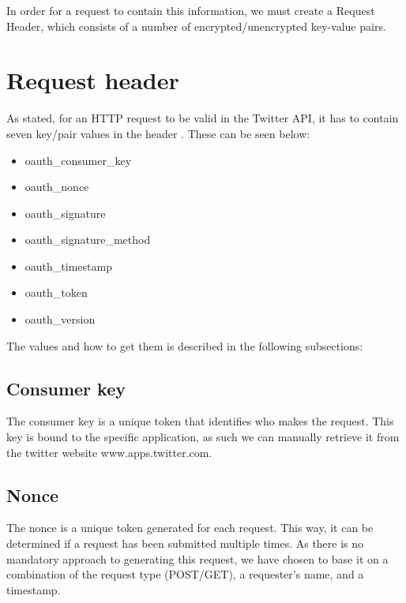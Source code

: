In order for a request to contain this information, we must create a Request
Header, which consists of a number of encrypted/unencrypted key-value pairs. 

\section{Request header}\label{sec:reqHead}
As stated, for an \ac{HTTP} request to be valid in the Twitter API, it has to
contain seven key/pair values in the header \citep{TwitterAPIAuth}. These can
be seen below:

\begin{itemize}
  \item oauth\_consumer\_key
  \item oauth\_nonce
  \item oauth\_signature
  \item oauth\_signature\_method
  \item oauth\_timestamp
  \item oauth\_token
  \item oauth\_version
\end{itemize}

The values and how to get them is described in the following subsections:

\subsection*{Consumer key}
The consumer key is a unique token that identifies who makes the request.
This key is bound to the specific application, as such we can manually retrieve
it from the twitter website www.apps.twitter.com.

\subsection*{Nonce}
The nonce is a unique token generated for each request. This way, it can be
determined if a request has been submitted multiple times. As there is no
mandatory approach to generating this request, we have chosen to base it on a
combination of the request type (POST/GET), a requester's name, and a timestamp.

